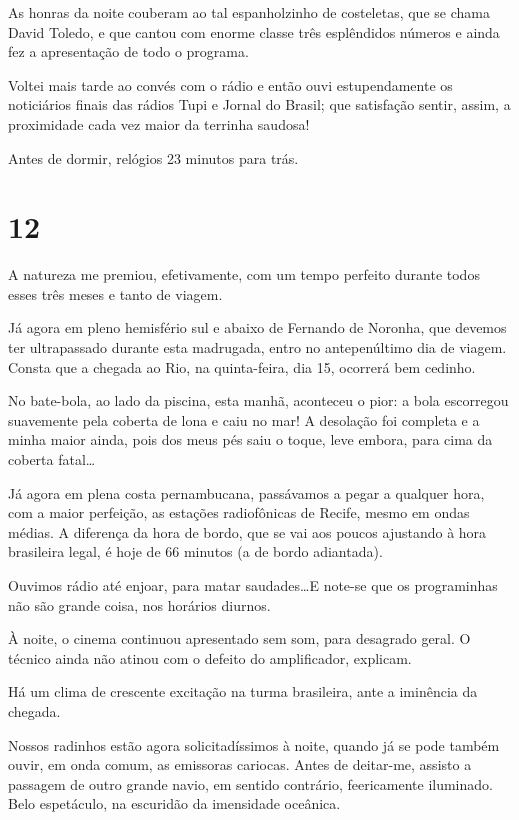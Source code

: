 As honras da noite couberam ao tal espanholzinho de costeletas, que se chama David Toledo, e que cantou com enorme classe três esplêndidos números e ainda fez a apresentação de todo o programa.

Voltei mais tarde ao convés com o rádio e então ouvi estupendamente os noticiários finais das rádios Tupi e Jornal do Brasil; que satisfação sentir, assim, a proximidade cada vez maior da terrinha saudosa!

Antes de dormir, relógios 23 minutos para trás.

\section*{12 \adfflatleafright {}}
A natureza me premiou, efetivamente, com um tempo perfeito durante todos esses três meses e tanto de viagem.

Já agora em pleno hemisfério sul e abaixo de Fernando de Noronha, que devemos ter ultrapassado durante esta madrugada, entro no antepenúltimo dia de viagem. Consta que a chegada ao Rio, na quinta-feira, dia 15, ocorrerá bem cedinho.

No bate-bola, ao lado da piscina, esta manhã, aconteceu o pior: a bola escorregou suavemente pela coberta de lona e caiu no mar! A desolação foi completa e a minha maior ainda, pois dos meus pés saiu o toque, leve embora, para cima da coberta fatal\ldots

Já agora em plena costa pernambucana, passávamos a pegar a qualquer hora, com a maior perfeição, as estações radiofônicas de Recife, mesmo em ondas médias. A diferença da hora de bordo, que se vai aos poucos ajustando à hora brasileira legal, é hoje de 66 minutos (a de bordo adiantada).

Ouvimos rádio até enjoar, para matar saudades\ldots E note-se que os programinhas não são grande coisa, nos horários diurnos.

À noite, o cinema continuou apresentado sem som, para desagrado geral. O técnico ainda não atinou com o defeito do amplificador, explicam.

Há um clima de crescente excitação na turma brasileira, ante a iminência da chegada.

Nossos radinhos estão agora solicitadíssimos à noite, quando já se pode também ouvir, em onda comum, as emissoras cariocas. Antes de deitar-me, assisto a passagem de outro grande navio, em sentido contrário, feericamente iluminado. Belo espetáculo, na escuridão da imensidade oceânica.

